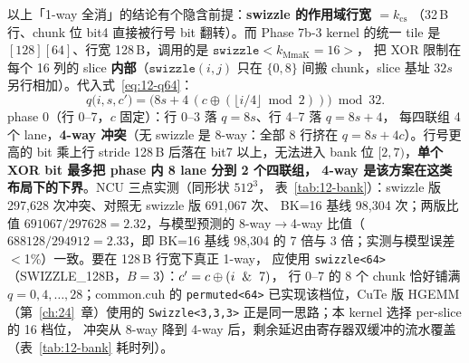 以上「1-way 全消」的结论有个隐含前提：\textbf{swizzle 的作用域行宽 $=k_{\mathrm{cs}}$}
（32\,B 行、chunk 位 bit4 直接被行号 bit 翻转）。而 Phase 7b-3 kernel 的统一 tile
是 $[128][64]$、行宽 128\,B，调用的是 $\texttt{swizzle}<k_{\mathrm{MmaK}}{=}16>$，
把 XOR 限制在每个 16 列的 slice \textbf{内部}（$\texttt{swizzle}(i,j)$ 只在
$\{0,8\}$ 间搬 chunk，slice 基址 $32s$ 另行相加）。代入式~\ref{eq:12-q64}：
\begin{equation}
  q\bigl(i,s,c'\bigr) = \bigl(8s + 4\,(c\oplus(\lfloor i/4\rfloor\bmod2))\bigr)\bmod 32 .
\end{equation}
phase 0（行 0--7，$c$ 固定）：行 0--3 落 $q=8s$、行 4--7 落 $q=8s{+}4$，
每四联组 4 个 lane，\textbf{4-way 冲突}（无 swizzle 是 8-way：全部 8 行挤在
$q=8s+4c$）。行号更高的 bit 乘上行 stride 128\,B 后落在 bit7 以上，无法进入
bank 位 $[2,7)$，\textbf{单个 XOR bit 最多把 phase 内 8 lane 分到 2 个四联组，
4-way 是该方案在这类布局下的下界}。NCU 三点实测（同形状 $512^3$，
表~\ref{tab:12-bank}）：swizzle 版 297{,}628 次冲突、对照无 swizzle 版 691{,}067 次、
BK=16 基线 98{,}304 次；两版比值 $691067/297628=2.32$，与模型预测的
8-way$\to$4-way 比值（$688128/294912=2.33$，即 BK=16 基线 98{,}304 的 7 倍与
3 倍；实测与模型误差 $<$1\%）一致。要在 128\,B 行宽下真正 1-way，
应使用 \texttt{swizzle<64>}（SWIZZLE\_128B，$B{=}3$）：$c'=c\oplus(i\And7)$，
行 0--7 的 8 个 chunk 恰好铺满 $q=0,4,\dots,28$；common.cuh 的
\texttt{permuted\allowbreak{}<64>} 已实现该档位，CuTe 版 HGEMM（第~\ref{ch:24}~章）使用的
\texttt{Swizzle\allowbreak{}<3,\allowbreak{}3,\allowbreak{}3>} 正是同一思路；本 kernel 选择 per-slice 的 16 档位，
冲突从 8-way 降到 4-way 后，剩余延迟由寄存器双缓冲的流水覆盖（表~\ref{tab:12-bank}
耗时列）。

